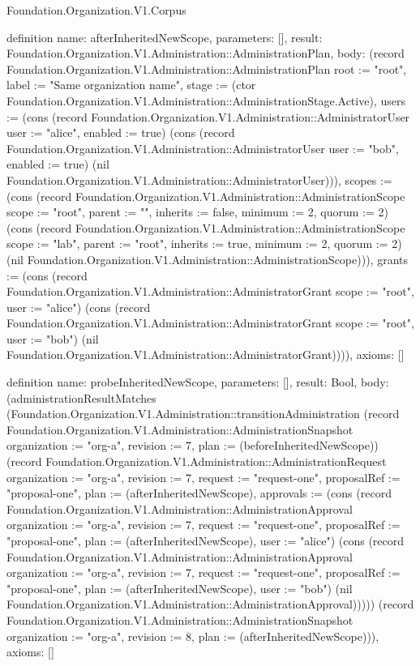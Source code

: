 \begin{lexlean}{Foundation.Organization.V1.Corpus}
\begin{semanticmodule}
definition{
  name: afterInheritedNewScope,
  parameters: [],
  result: Foundation.Organization.V1.Administration::AdministrationPlan,
  body: (record Foundation.Organization.V1.Administration::AdministrationPlan {root := "root", label := "Same organization name", stage := (ctor Foundation.Organization.V1.Administration::AdministrationStage.Active), users := (cons (record Foundation.Organization.V1.Administration::AdministratorUser {user := "alice", enabled := true}) (cons (record Foundation.Organization.V1.Administration::AdministratorUser {user := "bob", enabled := true}) (nil Foundation.Organization.V1.Administration::AdministratorUser))), scopes := (cons (record Foundation.Organization.V1.Administration::AdministrationScope {scope := "root", parent := "", inherits := false, minimum := 2, quorum := 2}) (cons (record Foundation.Organization.V1.Administration::AdministrationScope {scope := "lab", parent := "root", inherits := true, minimum := 2, quorum := 2}) (nil Foundation.Organization.V1.Administration::AdministrationScope))), grants := (cons (record Foundation.Organization.V1.Administration::AdministratorGrant {scope := "root", user := "alice"}) (cons (record Foundation.Organization.V1.Administration::AdministratorGrant {scope := "root", user := "bob"}) (nil Foundation.Organization.V1.Administration::AdministratorGrant)))}),
  axioms: []
}

definition{
  name: probeInheritedNewScope,
  parameters: [],
  result: Bool,
  body: (administrationResultMatches (Foundation.Organization.V1.Administration::transitionAdministration (record Foundation.Organization.V1.Administration::AdministrationSnapshot {organization := "org-a", revision := 7, plan := (beforeInheritedNewScope)}) (record Foundation.Organization.V1.Administration::AdministrationRequest {organization := "org-a", revision := 7, request := "request-one", proposalRef := "proposal-one", plan := (afterInheritedNewScope), approvals := (cons (record Foundation.Organization.V1.Administration::AdministrationApproval {organization := "org-a", revision := 7, request := "request-one", proposalRef := "proposal-one", plan := (afterInheritedNewScope), user := "alice"}) (cons (record Foundation.Organization.V1.Administration::AdministrationApproval {organization := "org-a", revision := 7, request := "request-one", proposalRef := "proposal-one", plan := (afterInheritedNewScope), user := "bob"}) (nil Foundation.Organization.V1.Administration::AdministrationApproval)))})) (record Foundation.Organization.V1.Administration::AdministrationSnapshot {organization := "org-a", revision := 8, plan := (afterInheritedNewScope)})),
  axioms: []
}


\end{semanticmodule}
\end{lexlean}
